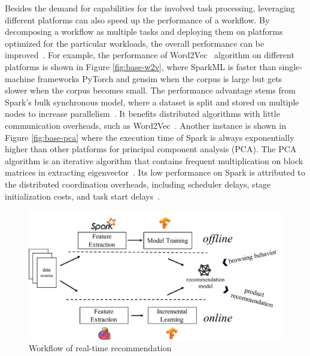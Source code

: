 Besides the demand for capabilities for the involved task processing, leveraging different platforms can also speed up the performance of a workflow. By decomposing a workflow as multiple tasks and deploying them on platforms optimized for the particular workloads, the overall performance can be improved~\cite{agrawal2016rheem, gog2015musketeer, gittens2018accelerating, tan2017enabling, anderson2017bridging}. For example, the performance of Word2Vec~\cite{mikolov2013efficient} algorithm on different platforms is shown in Figure \ref{fig:base-w2v}, where SparkML is faster than single-machine frameworks PyTorch and gensim when the corpus is large but gets slower when the corpus becomes small. The performance advantage stems from Spark’s bulk synchronous model, where a dataset is split and stored on multiple nodes to increase parallelism~\cite{zaharia2016apache}. It benefits distributed algorithms with little communication overheads, such as Word2Vec~\cite{stergiou2017distributed}. 
Another instance is shown in Figure \ref{fig:base-pca} where the execution time of Spark is always exponentially higher than other platforms for principal component analysis (PCA).  The PCA algorithm is an iterative algorithm that contains frequent multiplication on block matrices in extracting eigenvector~\cite{gittens2016matrix}. Its low performance on Spark is attributed to the distributed coordination overheads, including scheduler delays, stage initialization costs, and task start delays~\cite{gittens2018accelerating, bosagh2016matrix}.


\begin{figure}
  \centering
  \includegraphics[width=0.8\linewidth]{figures/recommendation.pdf}
  \caption{Workflow of real-time recommendation}
  \label{fig:recommend-workflow}
\end{figure}

